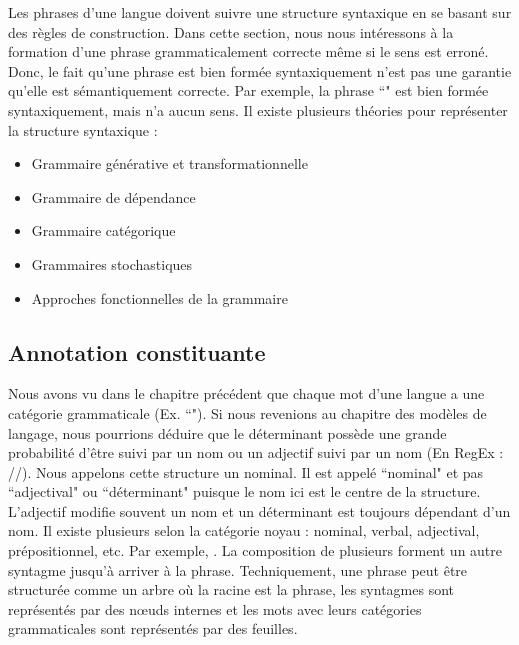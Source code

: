 \documentclass{KodeBook}
\begin{document}
Les phrases d'une langue doivent suivre une structure syntaxique en se basant sur des règles de construction.
Dans cette section, nous nous intéressons à la formation d'une phrase grammaticalement correcte même si le sens est erroné.
Donc, le fait qu'une phrase est bien formée syntaxiquement n'est pas une garantie qu'elle est sémantiquement correcte. 
Par exemple, la phrase ``" est bien formée syntaxiquement, mais n'a aucun sens.
Il existe plusieurs théories pour représenter la structure syntaxique :
\begin{itemize}
	\item Grammaire générative et transformationnelle 
	\item Grammaire de dépendance 
	\item Grammaire catégorique
	\item Grammaires stochastiques
	\item Approches fonctionnelles de la grammaire
\end{itemize}

\subsection{Annotation constituante}

Nous avons vu dans le chapitre précédent que chaque mot d'une langue a une catégorie grammaticale (Ex. ``"). 
Si nous revenions au chapitre des modèles de langage, nous pourrions déduire que le déterminant possède une grande probabilité d'être suivi par un nom ou un adjectif suivi par un nom (En RegEx : //). 
Nous appelons cette structure un  nominal. 
Il est appelé ``nominal" et pas ``adjectival" ou ``déterminant" puisque le nom ici est le centre de la structure. 
L'adjectif modifie souvent un nom et un déterminant est toujours dépendant d'un nom. 
Il existe plusieurs  selon la catégorie noyau : nominal, verbal, adjectival, prépositionnel, etc.
Par exemple, .
La composition de plusieurs  forment un autre syntagme jusqu'à arriver à la phrase. 
Techniquement, une phrase peut être structurée comme un arbre où la racine est la phrase, les syntagmes sont représentés par des nœuds internes et les mots avec leurs catégories grammaticales sont représentés par des feuilles.
\end{document}
